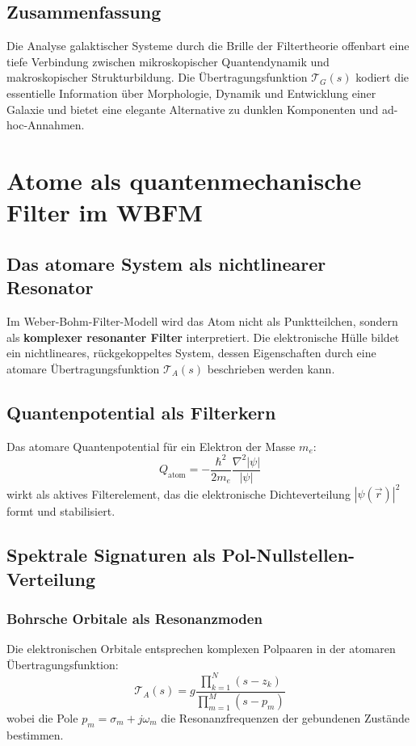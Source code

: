 \section{Zusammenfassung}
Die Analyse galaktischer Systeme durch die Brille der Filtertheorie offenbart eine tiefe Verbindung zwischen mikroskopischer Quantendynamik und makroskopischer
Strukturbildung. Die Übertragungsfunktion $\mathcal{T}_G(s)$ kodiert die essentielle Information über Morphologie, Dynamik und Entwicklung einer Galaxie und bietet eine
elegante Alternative zu dunklen Komponenten und ad-hoc-Annahmen.

\chapter{Atome als quantenmechanische Filter im WBFM}

\section{Das atomare System als nichtlinearer Resonator}

Im Weber-Bohm-Filter-Modell wird das Atom nicht als Punktteilchen, sondern als \textbf{komplexer resonanter Filter} interpretiert. Die elektronische Hülle bildet ein
nichtlineares, rückgekoppeltes System, dessen Eigenschaften durch eine atomare Übertragungsfunktion $\mathcal{T}_A(s)$ beschrieben werden kann.

\section{Quantenpotential als Filterkern}

Das atomare Quantenpotential für ein Elektron der Masse $m_e$:
\[
Q_{\text{atom}} = -\frac{\hbar^2}{2m_e}\frac{\nabla^2|\psi|}{|\psi|}
\]
wirkt als aktives Filterelement, das die elektronische Dichteverteilung $|\psi(\vec{r})|^2$ formt und stabilisiert.

\section{Spektrale Signaturen als Pol-Nullstellen-Verteilung}

\subsection{Bohrsche Orbitale als Resonanzmoden}
Die elektronischen Orbitale entsprechen komplexen Polpaaren in der atomaren Übertragungsfunktion:
\[
\mathcal{T}_A(s) = g\frac{\prod_{k=1}^{N}(s - z_k)}{\prod_{m=1}^{M}(s - p_m)}
\]
wobei die Pole $p_m = \sigma_m + j\omega_m$ die Resonanzfrequenzen der gebundenen Zustände bestimmen.


